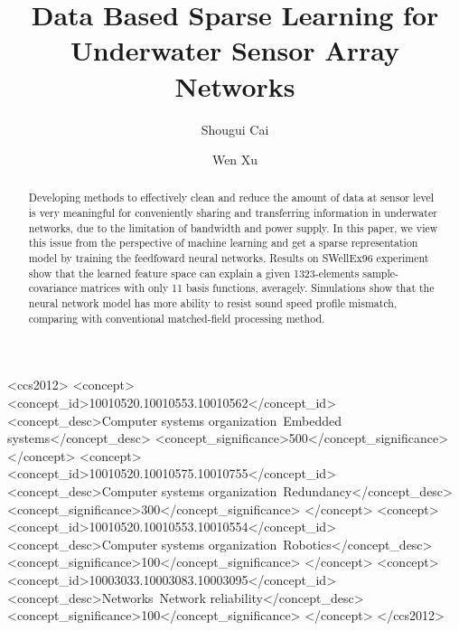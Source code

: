 \documentclass[sigconf]{acmart}
\begin{document}
\title{Data Based Sparse Learning for Underwater Sensor Array Networks
}
\author{Shougui Cai}

\author{Wen Xu}

\renewcommand{\shortauthors}{Shougui Cai.}


\begin{abstract}
Developing methods to effectively clean and reduce the amount of data at sensor level is very meaningful for conveniently sharing and transferring information in underwater networks, due to the limitation of bandwidth and power supply. In this paper, we view this issue from the perspective of machine learning
and get a sparse representation model by training the feedfoward neural networks.
Results on SWellEx96 experiment show that the learned feature space can explain a given 1323-elements sample-covariance matrices with only 11 basis functions, averagely.
Simulations show that the neural network model has more ability to resist sound speed profile mismatch, comparing with conventional matched-field processing method.
\end{abstract}

%
%
\begin{CCSXML}
<ccs2012>
 <concept>
  <concept_id>10010520.10010553.10010562</concept_id>
  <concept_desc>Computer systems organization~Embedded systems</concept_desc>
  <concept_significance>500</concept_significance>
 </concept>
 <concept>
  <concept_id>10010520.10010575.10010755</concept_id>
  <concept_desc>Computer systems organization~Redundancy</concept_desc>
  <concept_significance>300</concept_significance>
 </concept>
 <concept>
  <concept_id>10010520.10010553.10010554</concept_id>
  <concept_desc>Computer systems organization~Robotics</concept_desc>
  <concept_significance>100</concept_significance>
 </concept>
 <concept>
  <concept_id>10003033.10003083.10003095</concept_id>
  <concept_desc>Networks~Network reliability</concept_desc>
  <concept_significance>100</concept_significance>
 </concept>
</ccs2012>
\end{CCSXML}
\end{document}
